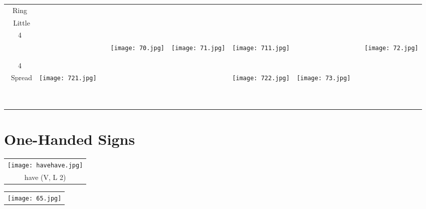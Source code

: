 \documentclass{tufte-book}
\begin{document}
\begin{fullwidth}
\begin{table}[h!]
\begin{center}
\begin{tabular}{|c|c|c|c|c|c|c|c|c|}
\footnotesize Ring& & & & & & & &\\\
\footnotesize Little& & & & & & & &\\\hline
\footnotesize 4& & & \footnotesize \pageref{page:70}&\footnotesize \pageref{page:71} &\footnotesize \pageref{page:711} & & &\footnotesize \pageref{page:72}\\
& & & \multirow{3}{*}{\texttt{[image: 70.jpg]}}&\multirow{3}{*}{\texttt{[image: 71.jpg]}}&\multirow{3}{*}{\texttt{[image: 711.jpg]}}& & &\multirow{3}{*}{\texttt{[image: 72.jpg]}}\\
& & & & & & & &\\\
& & & & & & & &\\\hline
\footnotesize 4&  \footnotesize \pageref{page:721}& & & & \footnotesize \pageref{page:722} &  \footnotesize \pageref{page:73}& &\\\
\footnotesize Spread &  \multirow{3}{*}{\texttt{[image: 721.jpg]}}& & & &  \multirow{3}{*}{\texttt{[image: 722.jpg]}} &  \multirow{3}{*}{\texttt{[image: 73.jpg]}}& &\\\
& & & & & & & &\\\
& & & & & & & &\\\hline
\end{tabular}
\end{center}
\end{table}













\newpage
\section{One-Handed Signs}
\label{page:beginonehand}%
\begin{table}[h!]
\begin{tabular}{c}
\texttt{[image: havehave.jpg]}\\
 have (V, L 2)\\
\end{tabular}
\end{table}

\begin{table}[h!]
\begin{tabular}{|c|}
\hline
\texttt{[image: 65.jpg]}\\
 

\end{tabular}
\end{table}
\end{fullwidth}
\end{document}
